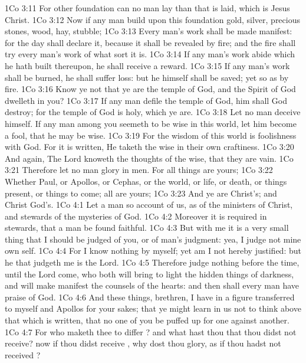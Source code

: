 \vs 1Co 3:11 For other foundation can no man lay than that is laid, which is Jesus Christ.
\vs 1Co 3:12 Now if any man build upon this foundation gold, silver, precious stones, wood, hay, stubble;
\vs 1Co 3:13 Every man's work shall be made manifest: for the day shall declare it, because it shall be revealed by fire; and the fire shall try every man's work of what sort it is.
\vs 1Co 3:14 If any man's work abide which he hath built thereupon, he shall receive a reward.
\vs 1Co 3:15 If any man's work shall be burned, he shall suffer loss: but he himself shall be saved; yet so as by fire.
\vs 1Co 3:16 Know ye not that ye are the temple of God, and  the Spirit of God dwelleth in you?
\vs 1Co 3:17 If any man defile the temple of God, him shall God destroy; for the temple of God is holy, which  ye are.
\vs 1Co 3:18 Let no man deceive himself. If any man among you seemeth to be wise in this world, let him become a fool, that he may be wise.
\vs 1Co 3:19 For the wisdom of this world is foolishness with God. For it is written, He taketh the wise in their own craftiness.
\vs 1Co 3:20 And again, The Lord knoweth the thoughts of the wise, that they are vain.
\vs 1Co 3:21 Therefore let no man glory in men. For all things are yours;
\vs 1Co 3:22 Whether Paul, or Apollos, or Cephas, or the world, or life, or death, or things present, or things to come; all are yours;
\vs 1Co 3:23 And ye are Christ's; and Christ  God's.
\vs 1Co 4:1 Let a man so account of us, as of the ministers of Christ, and stewards of the mysteries of God.
\vs 1Co 4:2 Moreover it is required in stewards, that a man be found faithful.
\vs 1Co 4:3 But with me it is a very small thing that I should be judged of you, or of man's judgment: yea, I judge not mine own self.
\vs 1Co 4:4 For I know nothing by myself; yet am I not hereby justified: but he that judgeth me is the Lord.
\vs 1Co 4:5 Therefore judge nothing before the time, until the Lord come, who both will bring to light the hidden things of darkness, and will make manifest the counsels of the hearts: and then shall every man have praise of God.
\vs 1Co 4:6 And these things, brethren, I have in a figure transferred to myself and  Apollos for your sakes; that ye might learn in us not to think  above that which is written, that no one of you be puffed up for one against another.
\vs 1Co 4:7 For who maketh thee to differ ? and what hast thou that thou didst not receive? now if thou didst receive , why dost thou glory, as if thou hadst not received ?
